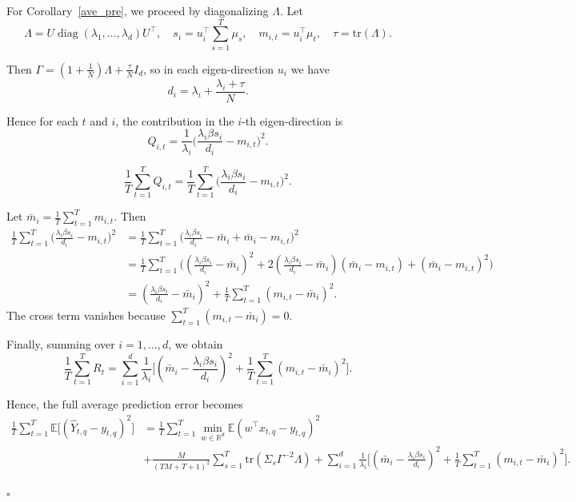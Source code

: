 \documentclass{article}
\theoremstyle{plain}
\theoremstyle{definition}
\theoremstyle{remark}
\begin{document}
For Corollary~\ref{ave_pre}, we proceed by diagonalizing $\Lambda$. Let
\[
\Lambda = U \operatorname{diag}(\lambda_1,\dots,\lambda_d) U^\top, 
\quad s_i = u_i^\top \sum_{s=1}^T \mu_s, \quad m_{i,t} = u_i^\top \mu_t, \quad \tau = \mathrm{tr}(\Lambda).
\]

Then $\Gamma = \left(1+\frac{1}{N}\right)\Lambda + \frac{\tau}{N} I_d$, so in each eigen-direction $u_i$ we have
\[
d_i = \lambda_i + \frac{\lambda_i + \tau}{N}.
\]

Hence for each $t$ and $i$, the contribution in the $i$-th eigen-direction is
\[
Q_{i,t} = \frac{1}{\lambda_i} \Big(\frac{\lambda_i \beta s_i}{d_i} - m_{i,t} \Big)^2.
\]

\[
\frac{1}{T}\sum_{t=1}^T Q_{i,t} = \frac{1}{T}\sum_{t=1}^T \Big(\frac{\lambda_i \beta s_i}{d_i} - m_{i,t} \Big)^2.
\]

Let $\bar m_i = \frac{1}{T}\sum_{t=1}^T m_{i,t}$. Then
\[
\begin{aligned}
\frac{1}{T}\sum_{t=1}^T \Big(\frac{\lambda_i \beta s_i}{d_i} - m_{i,t} \Big)^2 
&= \frac{1}{T}\sum_{t=1}^T \Big(\frac{\lambda_i \beta s_i}{d_i} - \bar m_i + \bar m_i - m_{i,t} \Big)^2 \\
&= \frac{1}{T}\sum_{t=1}^T \Big( (\frac{\lambda_i \beta s_i}{d_i} - \bar m_i)^2 + 2(\frac{\lambda_i \beta s_i}{d_i} - \bar m_i)(\bar m_i - m_{i,t}) + (\bar m_i - m_{i,t})^2 \Big) \\
&= (\frac{\lambda_i \beta s_i}{d_i} - \bar m_i)^2 + \frac{1}{T}\sum_{t=1}^T (m_{i,t} - \bar m_i)^2.
\end{aligned}
\]
The cross term vanishes because $\sum_{t=1}^T (m_{i,t}-\bar m_i)=0$.

Finally, summing over $i=1,\dots,d$, we obtain
\[
\frac{1}{T}\sum_{t=1}^T R_t = \sum_{i=1}^d \frac{1}{\lambda_i} \Big[ (\bar m_i - \frac{\lambda_i \beta s_i}{d_i})^2 + \frac{1}{T}\sum_{t=1}^T (m_{i,t}-\bar m_i)^2 \Big].
\]

Hence, the full average prediction error becomes
\begin{align*}
    \frac{1}{T}\sum_{t=1}^T \mathbb{E}\big[(\hat Y_{t,q}-y_{t,q})^2\big] &=
\frac{1}{T}\sum_{t=1}^T \min_{w\in\mathbb{R}^d} \mathbb{E}(w^\top x_{t,q} - y_{t,q})^2\\
&+ \frac{M}{(TM+T+1)^2} \sum_{s=1}^T \mathrm{tr}(\Sigma_s \Gamma^{-2}\Lambda)
+ \sum_{i=1}^d \frac{1}{\lambda_i} \Big[ (\bar m_i - \frac{\lambda_i \beta s_i}{d_i})^2 + \frac{1}{T}\sum_{t=1}^T (m_{i,t}-\bar m_i)^2 \Big].
\end{align*}

\hfill$\square$
\end{document}
